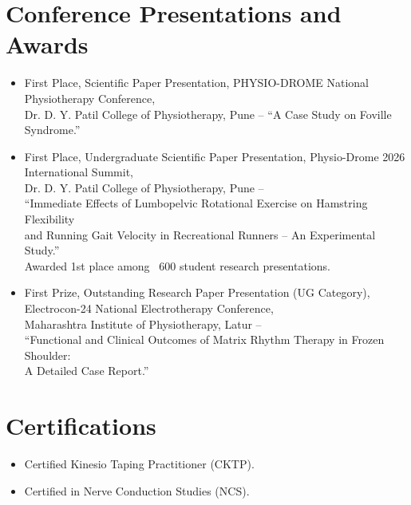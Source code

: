 \documentclass[11pt]{article}
\begin{document}
\section*{Conference Presentations and Awards}
\begin{itemize}
  \item First Place, Scientific Paper Presentation, PHYSIO-DROME National Physiotherapy Conference,\\
  Dr. D. Y. Patil College of Physiotherapy, Pune -- ``A Case Study on Foville Syndrome.''
  \item First Place, Undergraduate Scientific Paper Presentation, Physio-Drome 2026 International Summit,\\
  Dr. D. Y. Patil College of Physiotherapy, Pune --\\
  ``Immediate Effects of Lumbopelvic Rotational Exercise on Hamstring Flexibility\\
  and Running Gait Velocity in Recreational Runners -- An Experimental Study.''\\
  Awarded 1st place among ~600 student research presentations.
  \item First Prize, Outstanding Research Paper Presentation (UG Category),\\
  Electrocon-24 National Electrotherapy Conference,\\
  Maharashtra Institute of Physiotherapy, Latur --\\
  ``Functional and Clinical Outcomes of Matrix Rhythm Therapy in Frozen Shoulder:\\
  A Detailed Case Report.''
\end{itemize}

\section*{Certifications}
\begin{itemize}
  \item Certified Kinesio Taping Practitioner (CKTP).
  \item Certified in Nerve Conduction Studies (NCS).
\end{itemize}
\end{document}
